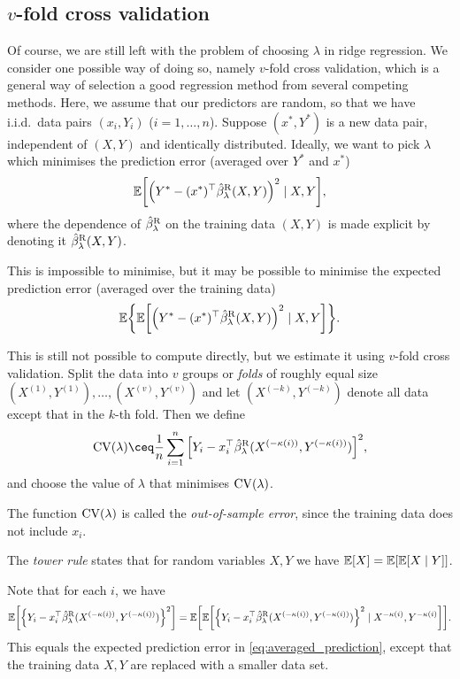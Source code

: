 \subsection{$v$-fold cross validation}
Of course, we are still left with the problem of choosing $\lambda$ in ridge regression. We consider one possible way of doing so, namely $v$-fold cross validation, which is a general way of selection a good regression method from several competing methods. Here, we assume that our predictors are random, so that we have i.i.d.\ data pairs $(x_i, Y_i)$ ($i = 1, \dotsc, n$). Suppose $(x^*, Y^*)$ is a new data pair, independent of $(X, Y)$ and identically distributed. Ideally, we want to pick $\lambda$ which minimises the prediction error (averaged over $Y^*$ and $x^*$)
\[
\mathbb E\qty[ \qty(Y^* - (x^*)^\top \hat\beta_\lambda^\mathrm{R}(X, Y))^2 \mid X, Y],
\]
where the dependence of $\hat\beta_\lambda^\mathrm{R}$ on the training data $(X, Y)$ is made explicit by denoting it $\hat\beta_\lambda^\mathrm{R}(X, Y)$. 

This is impossible to minimise, but it may be possible to minimise the expected prediction error (averaged over the training data)
\begin{equation} \label{eq:averaged_prediction}
\mathbb E\qty{ \mathbb E\qty[ \qty(Y^* - (x^*)^\top\hat\beta_\lambda^\mathrm{R}(X, Y))^2 \mid X, Y]}. 
\end{equation}

This is still not possible to compute directly, but we estimate it using $v$-fold cross validation. Split the data into $v$ groups or \emph{folds} of roughly equal size $(X^{(1)}, Y^{(1)}), \dotsc, (X^{(v)}, Y^{(v)})$ and let $(X^{(-k)}, Y^{(-k)})$ denote all data except that in the $k$-th fold. Then we define 
\[
\CV(\lambda) \ceq \frac1n \sum_{i=1}^n \qty[Y_i - x_i\T\hat\beta_\lambda^\Rm{R}(X^{(-\kappa(i))}, Y^{(-\kappa(i))})]^2, 
\]
and choose the value of $\lambda$ that minimises $\operatorname{CV}(\lambda)$. 

The function $\operatorname{CV}(\lambda)$ is called the \emph{out-of-sample error}, since the training data does not include $x_i$. 

\begin{recap}
    The \emph{tower rule} states that for random variables $X, Y$ we have $\mathbb E[X] = \mathbb E[\mathbb E[X \mid Y]]$. 
\end{recap}

Note that for each $i$, we have
\[
\mathbb E\qty[\qty{Y_i - x_i^\top\hat\beta_\lambda^\mathrm{R}(X^{(-\kappa(i))}, Y^{(-\kappa(i))})}^2] = \mathbb E\qty[ \mathbb E\qty[\qty{Y_i - x_i^\top\hat\beta_\lambda^\mathrm{R}(X^{(-\kappa(i))}, Y^{(-\kappa(i))})}^2 \mid X^{-\kappa(i)}, Y^{-\kappa(i)} ]]. 
\]
This equals the expected prediction error in \cref{eq:averaged_prediction}, except that the training data $X, Y$ are replaced with a smaller data set. 

